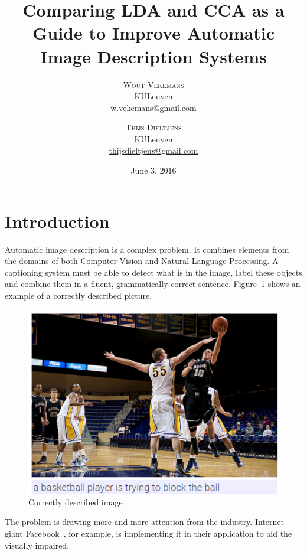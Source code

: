 \documentclass[twoside,twocolumn]{article}
\title{Comparing LDA and CCA as a Guide to Improve Automatic Image Description Systems} %
\author{%
	\textsc{Wout Vekemans} \\[1ex] %
	\normalsize KULeuven \\ %
	\normalsize \href{mailto:w.vekemans@gmail.com}{w.vekemans@gmail.com}
	\and %
	\textsc{Thijs Dieltjens} \\[1ex] %
	\normalsize KULeuven \\ %
	\normalsize \href{mailto:thijsdieltjens@gmail.com}{thijsdieltjens@gmail.com} %
}
\date{June 3, 2016} %
\begin{document}
	
	\maketitle
	
	
	\section{Introduction}
	Automatic image description is a complex problem. It combines elements from the domains of both Computer Vision and Natural Language Processing. A captioning system must be able to detect what is in the image, label these objects and combine them in a fluent, grammatically correct sentence. Figure~\ref{fig:exampledescription} shows an example of a correctly described picture.
	
	\begin{figure}[!htb]
		\centering
		\includegraphics[width=\linewidth]{blocking_the_ball_trimmed.png}
		\caption{Correctly described image}
		\label{fig:exampledescription}
	\end{figure}
	
	The problem is drawing more and more attention from the industry. Internet giant Facebook~\cite{facebook}, for example, is implementing it in their application to aid the visually impaired.
	
\end{document}
